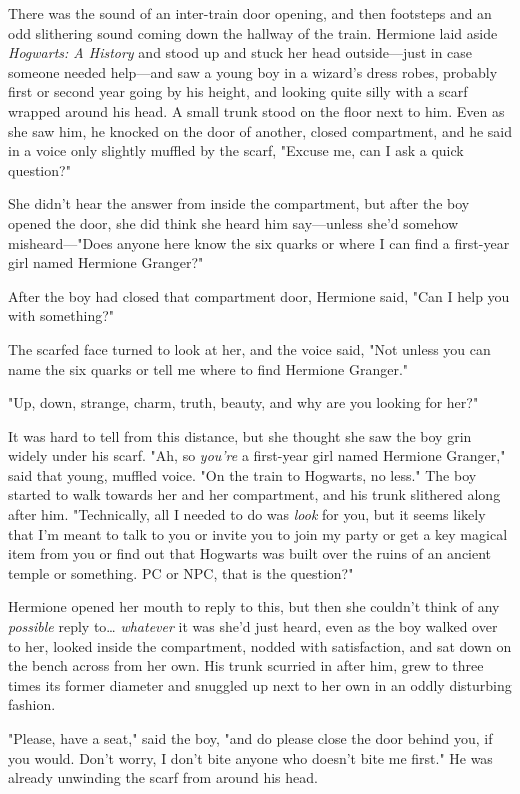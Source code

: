 There was the sound of an inter-train door opening, and then footsteps and an odd slithering sound coming down the hallway of the train. Hermione laid aside \emph{Hogwarts: A History} and stood up and stuck her head outside---just in case someone needed help---and saw a young boy in a wizard's dress robes, probably first or second year going by his height, and looking quite silly with a scarf wrapped around his head. A small trunk stood on the floor next to him. Even as she saw him, he knocked on the door of another, closed compartment, and he said in a voice only slightly muffled by the scarf, "Excuse me, can I ask a quick question?"

She didn't hear the answer from inside the compartment, but after the boy opened the door, she did think she heard him say---unless she'd somehow misheard---"Does anyone here know the six quarks or where I can find a first-year girl named Hermione Granger?"

After the boy had closed that compartment door, Hermione said, "Can I help you with something?"

The scarfed face turned to look at her, and the voice said, "Not unless you can name the six quarks or tell me where to find Hermione Granger."

"Up, down, strange, charm, truth, beauty, and why are you looking for her?"

It was hard to tell from this distance, but she thought she saw the boy grin widely under his scarf. "Ah, so \emph{you're} a first-year girl named Hermione Granger," said that young, muffled voice. "On the train to Hogwarts, no less." The boy started to walk towards her and her compartment, and his trunk slithered along after him. "Technically, all I needed to do was \emph{look} for you, but it seems likely that I'm meant to talk to you or invite you to join my party or get a key magical item from you or find out that Hogwarts was built over the ruins of an ancient temple or something. PC or NPC, that is the question?"

Hermione opened her mouth to reply to this, but then she couldn't think of any \emph{possible} reply to{\ldots} \emph{whatever} it was she'd just heard, even as the boy walked over to her, looked inside the compartment, nodded with satisfaction, and sat down on the bench across from her own. His trunk scurried in after him, grew to three times its former diameter and snuggled up next to her own in an oddly disturbing fashion.

"Please, have a seat," said the boy, "and do please close the door behind you, if you would. Don't worry, I don't bite anyone who doesn't bite me first." He was already unwinding the scarf from around his head.

